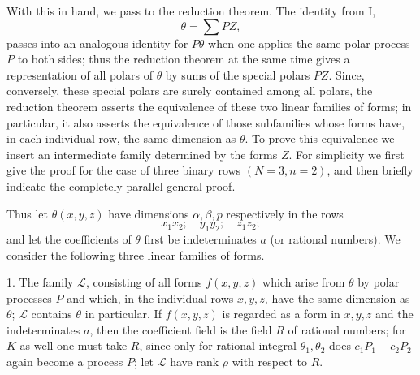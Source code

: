 \documentclass[11pt]{article}
\begin{document}
With this in hand, we pass to the reduction theorem. The identity from I,
\[
  \theta=\sum PZ,
\]
passes into an analogous identity for $P\theta$ when one applies the same polar process $P$ to both sides; thus the reduction theorem at the same time gives a representation of all polars of $\theta$ by sums of the special polars $PZ$. Since, conversely, these special polars are surely contained among all polars, the reduction theorem asserts the equivalence of these two linear families of forms; in particular, it also asserts the equivalence of those subfamilies whose forms have, in each individual row, the same dimension as $\theta$. To prove this equivalence we insert an intermediate family determined by the forms $Z$. For simplicity we first give the proof for the case of three binary rows $(N=3,n=2)$, and then briefly indicate the completely parallel general proof.

Thus let $\theta(x,y,z)$ have dimensions $\alpha,\beta,p$ respectively in the rows
\[
  x_1x_2;\quad y_1y_2;\quad z_1z_2;
\]
and let the coefficients of $\theta$ first be indeterminates $a$ (or rational numbers). We consider the following three linear families of forms.

1. The family $\mathcal L$, consisting of all forms $f(x,y,z)$ which arise from $\theta$ by polar processes $P$ and which, in the individual rows $x,y,z$, have the same dimension as $\theta$; $\mathcal L$ contains $\theta$ in particular. If $f(x,y,z)$ is regarded as a form in $x,y,z$ and the indeterminates $a$, then the coefficient field is the field $R$ of rational numbers; for $K$ as well one must take $R$, since only for rational integral $\theta_1,\theta_2$ does $c_1P_1+c_2P_2$ again become a process $P$; let $\mathcal L$ have rank $\rho$ with respect to $R$.
\end{document}
